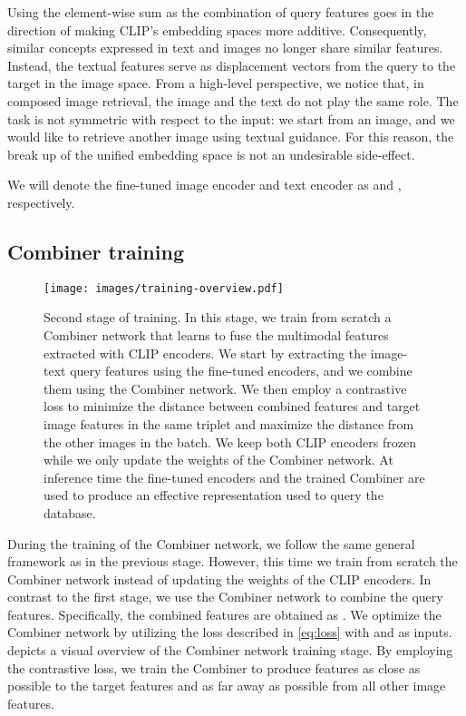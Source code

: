 \documentclass[acmlarge]{acmart}
\begin{document}
Using the element-wise sum as the combination of query features goes in the direction of making CLIP's embedding spaces more additive. Consequently, similar concepts expressed in text and images no longer share similar features. Instead, the textual features serve as displacement vectors from the query to the target in the image space.
From a high-level perspective, we notice that, in composed image retrieval, the image and the text do not play the same role. The task is not symmetric with respect to the input: we start from an image, and we would like to retrieve another image using textual guidance.
For this reason, the break up of the unified embedding space is not an undesirable side-effect.

We will denote the fine-tuned image encoder and text encoder as  and , respectively.

\subsection{Combiner training}\label{sec:combiner_training}
\begin{figure*}[tb]
 \texttt{[image: images/training-overview.pdf]}
  \caption{Second stage of training. In this stage, we train from scratch a Combiner network that learns to fuse the multimodal features extracted with CLIP encoders. We start by extracting the image-text query features using the fine-tuned encoders, and we combine them using the Combiner network. We then employ a contrastive loss to minimize the distance between combined features and target image features in the same triplet and maximize the distance from the other images in the batch. We keep both CLIP encoders frozen while we only update the weights of the Combiner network.
  At inference time the fine-tuned encoders and the trained Combiner are used to produce an effective representation used to query the database.}
  \label{fig:training}
\end{figure*}

During the training of the Combiner network, we follow the same general framework as in the previous stage. However, this time we train from scratch the Combiner network instead of updating the weights of the CLIP encoders.
In contrast to the first stage, we use the Combiner network  to combine the query features. Specifically, the combined features are obtained as .
We optimize the Combiner network by utilizing the  loss described in \cref{eq:loss} with  and  as inputs.  depicts a visual overview of the Combiner network training stage.
By employing the contrastive loss, we train the Combiner  to produce features as close as possible to the target features and as far away as possible from all other image features.
\end{document}
